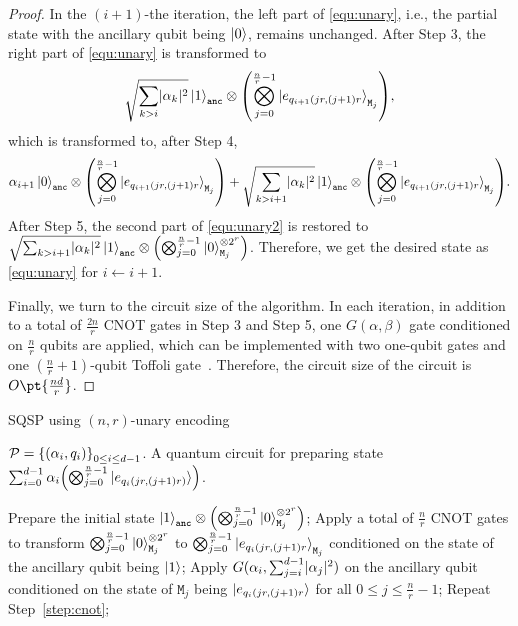 \documentclass[a4paper,UKenglish,cleveref, autoref, thm-restate]{lipics-v2021}
\DeclarePairedDelimiter\rbra{\lparen}{\rparen}
\DeclarePairedDelimiter\cbra{\{}{\}}
\DeclarePairedDelimiter\abs{\lvert}{\rvert}
\newcommand{\bo}{O\pt}
\begin{document}
\begin{proof}
    In the $(i+1)$-the iteration, the left part of \cref{equ:unary}, i.e., the partial state with the ancillary qubit being $\ket{0}$, remains unchanged. After Step 3, the right part of \cref{equ:unary} is transformed to 
    \begin{align}
        \sqrt{\sum_{k > i} \abs{\alpha_k}^2}\ket{1}_{\texttt{anc}} \otimes \rbra*{\bigotimes_{j=0}^{\frac{n}{r}-1}\ket{e_{q_{i+1}(jr, (j+1)r}}_{\texttt{M}_j}},
    \end{align}
    which is transformed to, after Step 4,
    \begin{align}\label{equ:unary2}
        \alpha_{i+1}\ket{0}_{\texttt{anc}} \otimes \rbra*{\bigotimes_{j=0}^{\frac{n}{r}-1}\ket{e_{q_{i+1}(jr, (j+1)r}}_{\texttt{M}_j}} + \sqrt{\sum_{k > i+1} \abs{\alpha_k}^2}\ket{1}_{\texttt{anc}} \otimes \rbra*{\bigotimes_{j=0}^{\frac{n}{r}-1}\ket{e_{q_{i+1}(jr, (j+1)r}}_{\texttt{M}_j}}.
    \end{align}
    After Step 5, the second part of \cref{equ:unary2} is restored to $\sqrt{\sum_{k > i+1} \abs{\alpha_k}^2}\ket{1}_{\texttt{anc}} \otimes \rbra*{\bigotimes_{j=0}^{\frac{n}{r}-1}\ket{0}^{\otimes 2^r}_{\texttt{M}_j}}$. Therefore, we get the desired state as \cref{equ:unary} for $i \xleftarrow{} i + 1$.

    Finally, we turn to the circuit size of the algorithm. In each iteration, in addition to a total of $\frac{2n}{r}$ CNOT gates in Step 3 and Step 5, one $G(\alpha, \beta)$ gate conditioned on $\frac{n}{r}$ qubits are applied, which can be implemented with two one-qubit gates and one $(\frac{n}{r}+1)$-qubit Toffoli gate~\cite{barenco1995elementary}. Therefore, the circuit size of the circuit is $\bo{\frac{nd}{r}}$.
\end{proof}

\begin{algorithm}[htbp]
    \caption{SQSP using $(n, r)$-unary encoding}\label{alg:unary} 
    \begin{algorithmic}[1]
    \REQUIRE $ \mathcal{P} = \cbra*{\rbra*{\alpha_i, q_i}}_{0\leq i \leq d-1}$.
    \ENSURE A quantum circuit for preparing state $\sum_{i=0}^{d-1} \alpha_i \rbra*{\bigotimes_{j=0}^{\frac{n}{r}-1} \ket{e_{q_i(jr, (j+1)r)}}}$.

   \STATE  Prepare the initial state $\ket{1}_{\texttt{anc}} \otimes \rbra*{\bigotimes_{j=0}^{\frac{n}{r}-1}\ket{0}^{\otimes 2^r}_{\texttt{M}_j}}$;
    \STATE Apply a total of $\frac{n}{r}$ CNOT gates to transform $\bigotimes_{j=0}^{\frac{n}{r}-1}\ket{0}^{\otimes 2^r}_{\texttt{M}_j}$ to $\bigotimes_{j=0}^{\frac{n}{r}-1}\ket{e_{q_i(jr, (j+1)r}}_{\texttt{M}_j}$ conditioned on the state of the ancillary qubit being $\ket{1}$; \label{step:cnot}
    \STATE Apply $G(\alpha_i, \sum_{j=i}^{d-1}\abs{\alpha_j}^2)$ on the ancillary qubit conditioned on the state of $\texttt{M}_j$ being $\ket{e_{q_i(jr, (j+1)r}}$ for all $0 \leq j \leq \frac{n}{r}-1$;
    \STATE Repeat Step~\ref{step:cnot};
    \ENDFOR
    \end{algorithmic}
\end{algorithm}
\end{document}
